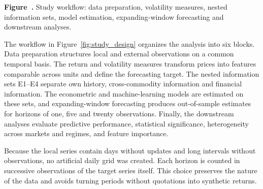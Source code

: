 \documentclass[a4paper,fleqn]{cas-sc}
\begin{document}
\begin{center}
\begin{minipage}{\textwidth}
\centering
{}
\noindent\textbf{Figure~\thefigure.} Study workflow: data preparation, volatility measures, nested information sets, model estimation, expanding-window forecasting and downstream analyses.
\end{minipage}
\end{center}
\label{fig:study_design}

The workflow in Figure~\ref{fig:study_design} organizes the analysis into six blocks. Data preparation structures local and external observations on a common temporal basis. The return and volatility measures transform prices into features comparable across units and define the forecasting target. The nested information sets E1--E4 separate own history, cross-commodity information and financial information. The econometric and machine-learning models are estimated on these sets, and expanding-window forecasting produces out-of-sample estimates for horizons of one, five and twenty observations. Finally, the downstream analyses evaluate predictive performance, statistical significance, heterogeneity across markets and regimes, and feature importance.

Because the local series contain days without updates and long intervals without observations, no artificial daily grid was created. Each horizon is counted in successive observations of the target series itself. This choice preserves the nature of the data and avoids turning periods without quotations into synthetic returns.
\end{document}
